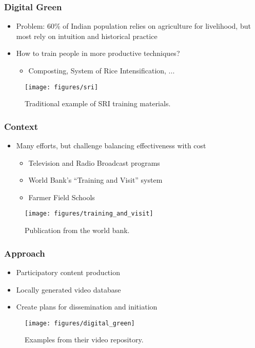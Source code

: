 \documentclass[10pt,mathserif]{beamer}
\begin{document}
\begin{frame}
  \frametitle{Digital Green}
  \begin{itemize}
  \item Problem: 60\% of Indian population relies on agriculture for livelihood,
    but most rely on intuition and historical practice
  \item How to train people in more productive techniques?
    \begin{itemize}
    \item Composting, System of Rice Intensification, ...
    \end{itemize}
  \end{itemize}
\begin{figure}[ht]
  \centering
  \texttt{[image: figures/sri]}
  \caption{Traditional example of SRI training materials. \label{fig:label} }
\end{figure}

\end{frame}

\begin{frame}
  \frametitle{Context}
  \begin{itemize}
  \item Many efforts, but challenge balancing effectiveness with cost
    \begin{itemize}
    \item Television and Radio Broadcast programs
    \item World Bank's ``Training and Visit'' system
    \item Farmer Field Schools
    \end{itemize}
  \end{itemize}
\begin{figure}[ht]
  \centering
  \texttt{[image: figures/training\_and\_visit]}
  \caption{Publication from the world bank. \label{fig:label} }
\end{figure}

\end{frame}

\begin{frame}
  \frametitle{Approach}
  \begin{itemize}
  \item Participatory content production
  \item Locally generated video database
  \item Create plans for dissemination and initiation
  \end{itemize}
\begin{figure}[ht]
  \centering
  \texttt{[image: figures/digital\_green]}
       \caption{Examples from their video repository. \label{fig:label} }
\end{figure}

\end{frame}
\end{document}
